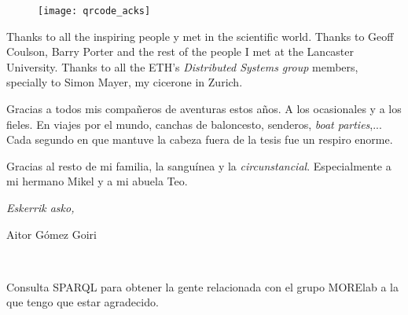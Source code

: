 \begin{acknowledgements}
\begin{figure}[h]
    \centering
    \texttt{[image: qrcode\_acks]}
\end{figure}


Thanks to all the inspiring people y met in the scientific world.
Thanks to Geoff Coulson, Barry Porter and the rest of the people I met at the Lancaster University.
Thanks to all the ETH's \emph{Distributed Systems group} members, specially to Simon Mayer, my cicerone in Zurich. %


Gracias a todos mis compañeros de aventuras estos años.
A los ocasionales y a los fieles.
En viajes por el mundo, canchas de baloncesto, senderos, \emph{boat parties},...
Cada segundo en que mantuve la cabeza fuera de la tesis fue un respiro enorme.


Gracias al resto de mi familia, la sanguínea y la \emph{circunstancial}.
Especialmente a mi hermano Mikel y a mi abuela Teo.


\begin{flushright}
\textit{Eskerrik asko,}

Aitor Gómez Goiri

\monthname \ \the\year



\end{flushright}

\begin{listing}
  \scriptsize
  
  \caption{Consulta SPARQL para obtener la gente relacionada con el grupo MORElab a la que tengo que estar agradecido.}
  \label{lst:workmates_ack}
\end{listing}



\end{acknowledgements}



